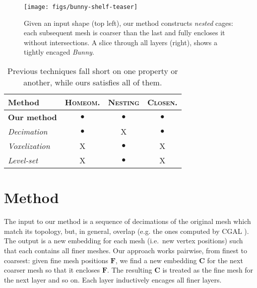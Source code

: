 \documentclass{cgyrf15}
\newcommand{\ra}[1]{\renewcommand{\arraystretch}{#1}}
\newcommand{\NO}{{\color{red}\textsf{X}}}
\newcommand{\YES}{$\bullet$}
\begin{document}
\begin{figure}[t]
  \texttt{[image: figs/bunny-shelf-teaser]} 
  \vspace*{-2em}
  \caption{Given an input shape (top left), our method constructs \emph{nested} cages:
each subsequent mesh is coarser than the last and fully encloses it without
intersections. A slice through all layers (right), shows a tightly
encaged \emph{Bunny}. 
  }
  \label{fig:bunny-shelf-teaser}
\end{figure}

\begin{table}
\centering
\ra{1.0}
\setlength{\tabcolsep}{5.5pt}
\begin{tabularx}{\linewidth}{X c c c}
\rowcolor{white}
\toprule
Method               & \textsc{Homeom.} & \textsc{Nesting}& \textsc{Closen.} \\
\midrule                                                                       
\textbf{Our method}  & \YES                  & \YES            & \YES           \\
\emph{Decimation}                                                               
                     & \YES                  & \NO             & \YES           \\
\emph{Voxelization}                                                             
                     & \NO                   & \YES            & \NO            \\
\emph{Level-set}                                                                
                     & \NO                   & \YES            & \NO            \\
\bottomrule
\end{tabularx}
\vspace*{-1em}
\caption{
Previous techniques fall short
on one property or another, while ours satisfies all of them.}
\label{tab:feature-chart}
\end{table}

\section{Method}

The input to our method is a sequence of decimations of the original mesh which
match its topology, but, in general, overlap (e.g. the ones computed by CGAL
\cite{cgal}). The output is a new embedding for each mesh (i.e.\ new vertex
positions) such that each contains all finer meshes. Our approach works
pairwise, from finest to coarsest: given fine mesh positions $\mathbf{F}$, we
find a new embedding $\mathbf{C}$ for the next coarser mesh so that it encloses
$\mathbf{F}$. The resulting $\mathbf{C}$ is treated as the fine mesh for the
next layer and so on. Each layer inductively encages all finer layers.
\end{document}
